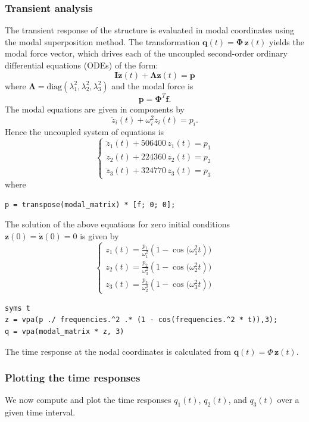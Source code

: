 \documentclass[12pt]{article}
\begin{document}
\subsubsection*{Transient analysis}
The transient response of the structure is evaluated in modal coordinates using the modal superposition method. The transformation $\mathbf{q}(t) = \boldsymbol{\Phi} \, \mathbf{z}(t)$ yields the modal force vector, which drives each of the uncoupled second-order ordinary differential equations (ODEs) of the form:
$$\mathbf I\ddot{\mathbf z}(t)+\mathbf \Lambda\mathbf z(t)=\mathbf p$$
where $\mathbf \Lambda=\text{diag}(\lambda_1^2,\lambda_2^2,\lambda_3^2)$ and the modal force is
$$\mathbf p=\boldsymbol{\Phi}^T \mathbf{f}.$$
The modal equations are given in components by
$$\ddot z_i(t)+\omega_i^2 z_i(t)=p_i.$$
Hence the uncoupled system of equations is
$$\begin{cases}\ddot z_1(t)+506400\, z_1(t)=p_1 \\ \ddot z_2(t)+224360\, z_2(t)=p_2 \\ \ddot z_3(t)+324770\, z_3(t)=p_3\end{cases}$$
where
\begin{verbatim}
p = transpose(modal_matrix) * [f; 0; 0];
\end{verbatim}
The solution of the above equations for zero initial conditions $\mathbf z(0)=\dot{\mathbf z}(0)=0$ is given by
$$\begin{cases}
        z_1(t) = \frac{p_1}{\omega_1^2}(1 - \cos\big(\omega_1^2 t)\big) \\
        z_2(t) = \frac{p_2}{\omega_3^2}(1 - \cos\big(\omega_2^2 t)\big) \\
        z_3(t) = \frac{p_3}{\omega_2^2}(1 - \cos\big(\omega_3^2 t)\big)
    \end{cases}$$

\begin{verbatim}
syms t
z = vpa(p ./ frequencies.^2 .* (1 - cos(frequencies.^2 * t)),3);
q = vpa(modal_matrix * z, 3)
\end{verbatim}

The time response at the nodal coordinates is calculated from $\mathbf{q}(t)={\Phi}\, \mathbf z(t)$.

\subsubsection*{Plotting the time responses}
We now compute and plot the time responses $q_1(t)$, $q_2(t)$, and $q_3(t)$ over a given time interval.
\end{document}
